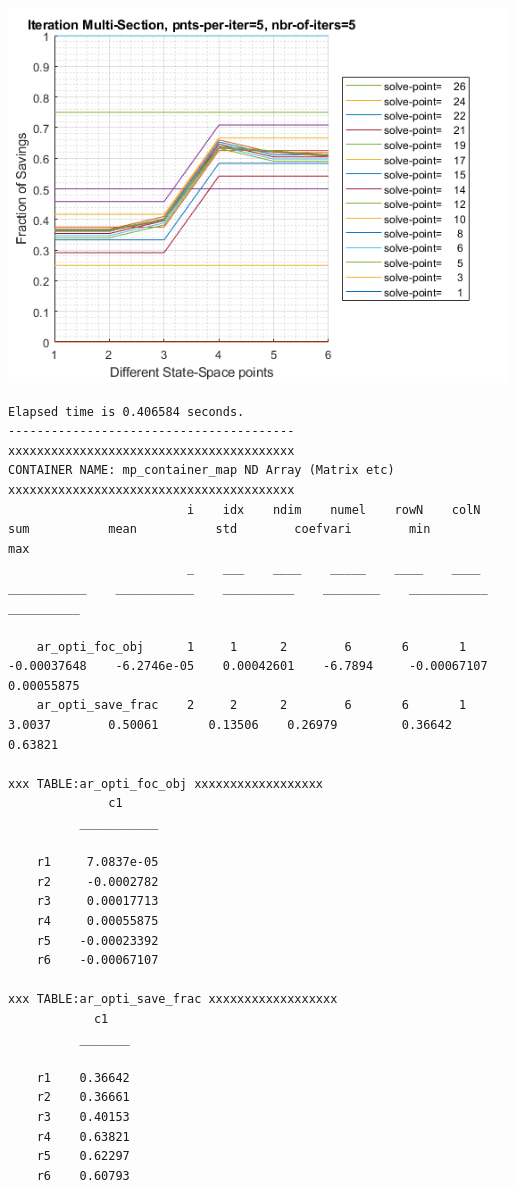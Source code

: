 \documentclass[
]{book}
\begin{document}
\includegraphics[width=5.20833in,height=\textheight]{img/fx_optim_mlsec_savezrone_images/figure_0.png}

\begin{verbatim}
Elapsed time is 0.406584 seconds.
----------------------------------------
xxxxxxxxxxxxxxxxxxxxxxxxxxxxxxxxxxxxxxxx
CONTAINER NAME: mp_container_map ND Array (Matrix etc)
xxxxxxxxxxxxxxxxxxxxxxxxxxxxxxxxxxxxxxxx
                         i    idx    ndim    numel    rowN    colN        sum           mean           std        coefvari        min           max    
                         _    ___    ____    _____    ____    ____    ___________    ___________    __________    ________    ___________    __________

    ar_opti_foc_obj      1     1      2        6       6       1      -0.00037648    -6.2746e-05    0.00042601    -6.7894     -0.00067107    0.00055875
    ar_opti_save_frac    2     2      2        6       6       1           3.0037        0.50061       0.13506    0.26979         0.36642       0.63821

xxx TABLE:ar_opti_foc_obj xxxxxxxxxxxxxxxxxx
              c1     
          ___________

    r1     7.0837e-05
    r2     -0.0002782
    r3     0.00017713
    r4     0.00055875
    r5    -0.00023392
    r6    -0.00067107

xxx TABLE:ar_opti_save_frac xxxxxxxxxxxxxxxxxx
            c1   
          _______

    r1    0.36642
    r2    0.36661
    r3    0.40153
    r4    0.63821
    r5    0.62297
    r6    0.60793
\end{verbatim}
\end{document}
